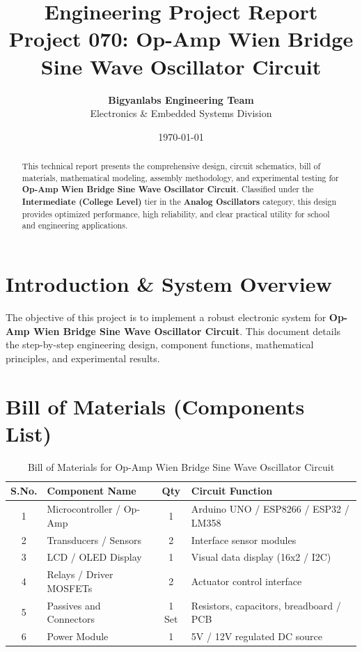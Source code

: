 \documentclass[11pt,a4paper]{article}
\title{\textbf{\Huge Engineering Project Report}\\[0.5em] \Large Project 070: Op-Amp Wien Bridge Sine Wave Oscillator Circuit}
\author{\textbf{Bigyanlabs Engineering Team}\\ Electronics \& Embedded Systems Division}
\date{\today}
\begin{document}
\maketitle
\thispagestyle{empty}

\begin{abstract}
This technical report presents the comprehensive design, circuit schematics, bill of materials, mathematical modeling, assembly methodology, and experimental testing for \textbf{Op-Amp Wien Bridge Sine Wave Oscillator Circuit}. Classified under the \textbf{Intermediate (College Level)} tier in the \textbf{Analog Oscillators} category, this design provides optimized performance, high reliability, and clear practical utility for school and engineering applications.
\end{abstract}

\newpage
\tableofcontents
\newpage

\section{Introduction \& System Overview}
The objective of this project is to implement a robust electronic system for \textbf{Op-Amp Wien Bridge Sine Wave Oscillator Circuit}. This document details the step-by-step engineering design, component functions, mathematical principles, and experimental results.

\section{Bill of Materials (Components List)}
\begin{table}[h!]
\centering
\caption{Bill of Materials for Op-Amp Wien Bridge Sine Wave Oscillator Circuit}
\vspace{0.5em}
\begin{tabular}{clcp{7cm}}
\toprule
\textbf{S.No.} & \textbf{Component Name} & \textbf{Qty} & \textbf{Circuit Function} \\
\midrule
1 & Microcontroller / Op-Amp & 1 & Arduino UNO / ESP8266 / ESP32 / LM358 \\
2 & Transducers / Sensors & 2 & Interface sensor modules \\
3 & LCD / OLED Display & 1 & Visual data display (16x2 / I2C) \\
4 & Relays / Driver MOSFETs & 2 & Actuator control interface \\
5 & Passives and Connectors & 1 Set & Resistors, capacitors, breadboard / PCB \\
6 & Power Module & 1 & 5V / 12V regulated DC source \\
\bottomrule
\end{tabular}
\end{table}
\end{document}
